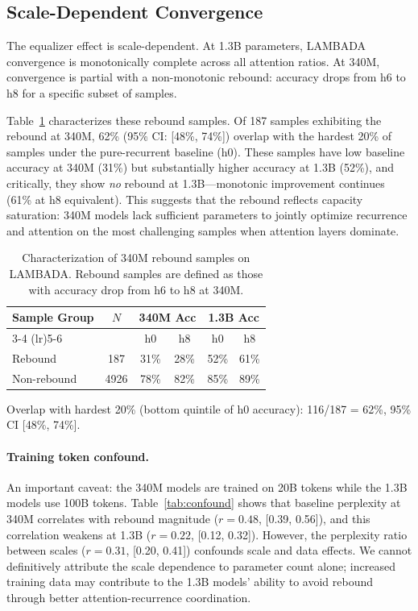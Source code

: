 \documentclass[11pt,a4paper]{article}
\begin{document}
\subsection{Scale-Dependent Convergence}
\label{sec:scale}

The equalizer effect is scale-dependent. At 1.3B parameters, LAMBADA convergence is monotonically complete across all attention ratios. At 340M, convergence is partial with a non-monotonic rebound: accuracy drops from h6 to h8 for a specific subset of samples.

Table~\ref{tab:rebound} characterizes these rebound samples. Of 187 samples exhibiting the rebound at 340M, 62\% (95\% CI: [48\%, 74\%]) overlap with the hardest 20\% of samples under the pure-recurrent baseline (h0). These samples have low baseline accuracy at 340M (31\%) but substantially higher accuracy at 1.3B (52\%), and critically, they show \emph{no} rebound at 1.3B---monotonic improvement continues (61\% at h8 equivalent). This suggests that the rebound reflects capacity saturation: 340M models lack sufficient parameters to jointly optimize recurrence and attention on the most challenging samples when attention layers dominate.

\begin{table}[t]
\centering
\small
\caption{Characterization of 340M rebound samples on LAMBADA. Rebound samples are defined as those with accuracy drop from h6 to h8 at 340M.}
\label{tab:rebound}
\begin{tabular}{@{}lccccc@{}}
\toprule
Sample Group & $N$ & \multicolumn{2}{c}{340M Acc} & \multicolumn{2}{c}{1.3B Acc} \\
\cmidrule(lr){3-4} \cmidrule(lr){5-6}
 & & h0 & h8 & h0 & h8 \\
\midrule
Rebound & 187 & 31\% & 28\% & 52\% & 61\% \\
Non-rebound & 4926 & 78\% & 82\% & 85\% & 89\% \\
\bottomrule
\end{tabular}

\vspace{2pt}
{\footnotesize Overlap with hardest 20\% (bottom quintile of h0 accuracy): 116/187 = 62\%, 95\% CI [48\%, 74\%].}
\end{table}

\paragraph{Training token confound.} An important caveat: the 340M models are trained on 20B tokens while the 1.3B models use 100B tokens. Table~\ref{tab:confound} shows that baseline perplexity at 340M correlates with rebound magnitude ($r{=}0.48$, [0.39, 0.56]), and this correlation weakens at 1.3B ($r{=}0.22$, [0.12, 0.32]). However, the perplexity ratio between scales ($r{=}0.31$, [0.20, 0.41]) confounds scale and data effects. We cannot definitively attribute the scale dependence to parameter count alone; increased training data may contribute to the 1.3B models' ability to avoid rebound through better attention-recurrence coordination.
\end{document}
